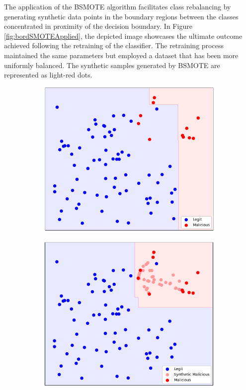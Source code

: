 The application of the BSMOTE algorithm facilitates class rebalancing by generating synthetic data points in the boundary regions between the classes concentrated in proximity of the decision boundary.
In Figure \ref{fig:bordSMOTEApplied}, the depicted image showcases the ultimate outcome achieved following the retraining of the classifier. 
The retraining process maintained the same parameters but employed a dataset that has been more uniformly balanced.
The synthetic samples generated by BSMOTE are represented as light-red dots.
\begin{figure}[H]
  \centering
  \begin{subfigure}{0.48\linewidth}
    \includegraphics[width=\linewidth]{graphics/BordSMOTE_no.png}
    \caption{}
    \label{fig:bordSMOTEnotApplied}
  \end{subfigure}
  \hspace{0.02\linewidth}
  \begin{subfigure}{0.48\linewidth}
    \includegraphics[width=\linewidth]{graphics/BordSMOTE_yes.png}

\end{subfigure}
\end{figure}
